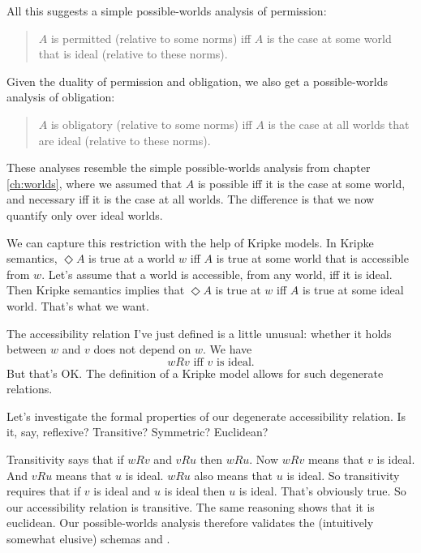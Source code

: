 All this suggests a simple possible-worlds analysis of permission:
\begin{quote}
  $A$ is permitted (relative to some norms) iff $A$ is the case at some
  world that is ideal (relative to these norms).
\end{quote}
%
Given the duality of permission and obligation, we also get a possible-worlds
analysis of obligation:
%
\begin{quote}
  $A$ is obligatory (relative to some norms) iff $A$ is the case at
  all worlds that are ideal (relative to these norms).
\end{quote}

These analyses resemble the simple possible-worlds analysis from chapter
\ref{ch:worlds}, where we assumed that $A$ is possible iff it is the case at
some world, and necessary iff it is the case at all worlds. The difference is
that we now quantify only over ideal worlds.

We can capture this restriction with the help of Kripke models. In Kripke
semantics, $\Diamond A$ is true at a world $w$ iff $A$ is true at some world
that is accessible from $w$. Let's assume that a world is accessible, from any
world, iff it is ideal. Then Kripke semantics implies that $\Diamond A$ is true
at $w$ iff $A$ is true at some ideal world. That's what we want.

The accessibility relation I've just defined is a little unusual: whether it
holds between $w$ and $v$ does not depend on $w$. We have
\[
  wRv \text{ iff  $v$ is ideal.}
\]
But that's OK. The definition of a Kripke model allows for such
degenerate relations.

Let's investigate the formal properties of our degenerate accessibility
relation. Is it, say, reflexive? Transitive? Symmetric? Euclidean?

Transitivity says that if $wRv$ and $vRu$ then $wRu$. Now $wRv$ means that $v$
is ideal. And $vRu$ means that $u$ is ideal. $wRu$ also means that $u$ is ideal.
So transitivity requires that if $v$ is ideal and $u$ is ideal then $u$ is
ideal. That's obviously true. So our accessibility relation is transitive. The
same reasoning shows that it is euclidean. Our possible-worlds analysis
therefore validates the (intuitively somewhat elusive) schemas  and
.
%
\begin{principles}
\\
\end{principles}

